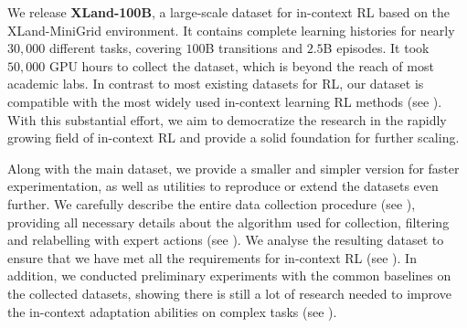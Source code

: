 \documentclass{article}
\begin{document}
We release \textbf{XLand-100B}, a large-scale dataset for in-context RL based on the XLand-MiniGrid \citep{nikulin2023xland} environment. It contains complete learning histories for nearly $30,000$ different tasks, covering $100$B transitions and $2.5$B episodes. It took $50,000$ GPU hours to collect the dataset, which is beyond the reach of most academic labs. In contrast to most existing datasets for RL, our dataset is compatible with the most widely used in-context learning RL methods (see ). With this substantial effort, we aim to democratize the research in the rapidly growing field of in-context RL and provide a solid foundation for further scaling. 

Along with the main dataset, we provide a smaller and simpler version for faster experimentation, as well as utilities to reproduce or extend the datasets even further. We carefully describe the entire data collection procedure (see ), providing all necessary details about the algorithm used for collection, filtering and relabelling with expert actions (see ). We analyse the resulting dataset to ensure that we have met all the requirements for in-context RL (see ). In addition, we conducted preliminary experiments with the common baselines on the collected datasets, showing there is still a lot of research needed to improve the in-context adaptation abilities on complex tasks (see ). 

\end{document}
